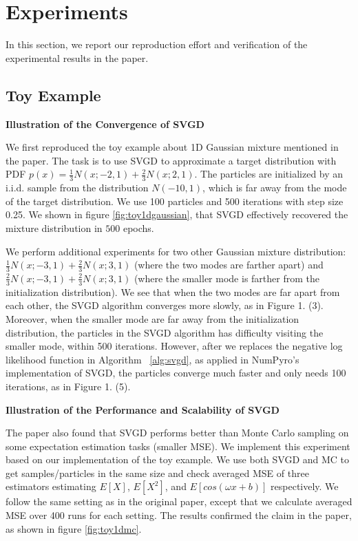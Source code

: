 \section{Experiments}
In this section, we report our reproduction effort and verification of the experimental results in the paper.

\subsection{Toy Example}


\noindent\textbf{Illustration of the Convergence of SVGD}

We first reproduced the toy example about 1D Gaussian mixture mentioned in the paper. The task is to use SVGD to approximate a target distribution with PDF $p(x) = \frac{1}{3} N(x; -2, 1) + \frac{2}{3} N(x; 2, 1)$. The particles are initialized by an i.i.d. sample from the distribution $N(-10, 1)$, which is far away from the mode of the target distribution. We use 100 particles and 500 iterations with step size 0.25. We shown in figure \ref{fig:toy1dgaussian}, that SVGD effectively recovered the mixture distribution in $500$ epochs.

We perform additional experiments for two other Gaussian mixture distribution: $\frac{1}{3} N(x; -3, 1) + \frac{2}{3} N(x; 3, 1)$ (where the two modes are farther apart) and $\frac{2}{3} N(x; -3, 1) + \frac{2}{3} N(x; 3, 1)$ (where the smaller mode is farther from the initialization distribution). We see that when the two modes are far apart from each other, the SVGD algorithm converges more slowly, as in Figure 1. (3). Moreover, when the smaller mode are far away from the initialization distribution, the particles in the SVGD algorithm has difficulty visiting the smaller mode, within 500 iterations. However, after we replaces the negative log likelihood function in Algorithm ~\ref{alg:svgd}, as applied in NumPyro's implementation of SVGD, the particles converge much faster and only needs 100 iterations, as in Figure 1. (5). 

\noindent\textbf{Illustration of the Performance and Scalability of SVGD}

The paper also found that SVGD performs better than Monte Carlo sampling on some expectation estimation tasks (smaller MSE). We implement this experiment based on our implementation of the toy example. We use both SVGD and MC to get samples/particles in the same size and check averaged MSE of three estimators estimating $E[X]$, $E[X^2]$, and $E[cos(\omega x + b)]$ respectively. We follow the same setting as in the original paper, except that we calculate averaged MSE over 400 runs for each setting. The results confirmed the claim in the paper, as shown in figure \ref{fig:toy1dmc}.

